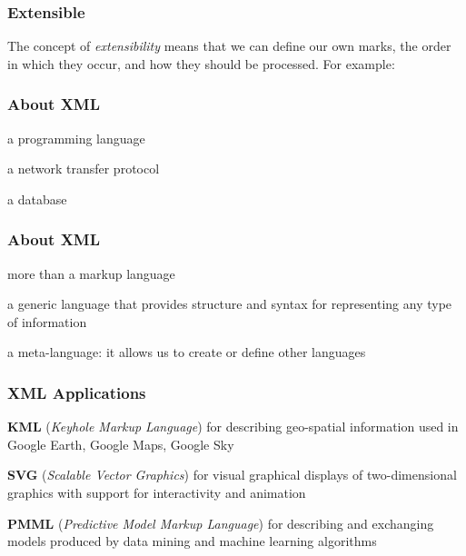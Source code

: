 \documentclass[12pt]{beamer}\usepackage[]{graphicx}\usepackage[]{color}
\begin{document}

\begin{frame}[fragile]
\frametitle{Extensible}

The concept of \textit{extensibility} means that we can define our own marks, the order in which they occur, and how they should be processed. For example:
 \bi
  \item {}
  \item {}
  \item {}
  \item {}
 \ei
\eb

\end{frame}


\begin{frame}
\frametitle{About XML}

\bbi
 \item a programming language
 \item a network transfer protocol
 \item a database
\ei
\eb

\end{frame}


\begin{frame}
\frametitle{About XML}

\bbi
 \item more than a markup language
 \item a generic language that provides structure and syntax for representing any type of information
 \item a meta-language: it allows us to create or define other languages
\ei
\eb

\end{frame}


\begin{frame}
\frametitle{XML Applications}

\bbi
 \item \textbf{KML} (\textit{Keyhole Markup Language}) for describing geo-spatial information used in Google Earth, Google Maps, Google Sky
 \item \textbf{SVG} (\textit{Scalable Vector Graphics}) for visual graphical displays of two-dimensional graphics with support for interactivity and animation
 \item \textbf{PMML} (\textit{Predictive Model Markup Language}) for describing and exchanging models produced by data mining and machine learning algorithms
\ei
\eb

\end{frame}
\end{document}
